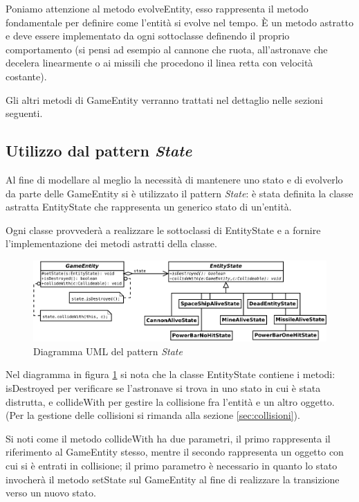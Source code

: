 \documentclass[a4paper,12pt]{article}
\begin{document}
Poniamo attenzione al metodo \textsf{evolveEntity}, esso rappresenta il metodo fondamentale per definire come l'entit\`a si evolve nel tempo. \`E un metodo astratto e deve essere implementato da ogni sottoclasse definendo il proprio comportamento (si pensi ad esempio al cannone che ruota, all'astronave che decelera linearmente o ai missili che procedono il linea retta con velocit\`a costante).

Gli altri metodi di \textsf{GameEntity} verranno trattati nel dettaglio nelle sezioni seguenti.

\subsection{Utilizzo dal pattern \emph{State}}
\label{sec:state}

Al fine di modellare al meglio la necessit\`a di mantenere uno stato e di evolverlo da parte delle \textsf{GameEntity} si \`e utilizzato il pattern \emph{State}: \`e stata definita la classe astratta \textsf{EntityState} che rappresenta un generico stato di un'entit\`a.

Ogni classe provveder\`a a realizzare le sottoclassi di \textsf{EntityState} e a fornire l'implementazione dei metodi astratti della classe.

\begin{figure}[h]
\centering
\includegraphics[width=15cm]{State.pdf}
\caption{Diagramma UML del pattern \emph{State}}
\label{img:State}
\end{figure}

Nel diagramma in figura \ref{img:State} si nota che la classe \textsf{EntityState} contiene i metodi: \textsf{isDestroyed} per verificare se l'astronave si trova in uno stato in cui \`e stata distrutta, e \textsf{collideWith} per gestire la collisione fra l'entit\`a e un altro oggetto. (Per la gestione delle collisioni si rimanda alla sezione \ref{sec:collisioni}).

Si noti come il metodo \textsf{collideWith} ha due parametri, il primo rappresenta il riferimento al \textsf{GameEntity} stesso, mentre il secondo rappresenta un oggetto con cui si \`e entrati in collisione; il primo parametro \`e necessario in quanto lo stato invocher\`a il metodo \textsf{setState} sul \textsf{GameEntity} al fine di realizzare la transizione verso un nuovo stato.
\end{document}
